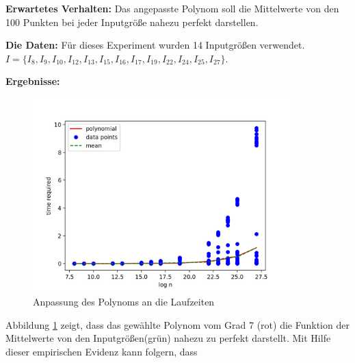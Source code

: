 \documentclass[12pt,oneside]{article}
\theoremstyle{remark}
\theoremstyle{definition}
\begin{document}
\textbf{\small{Erwartetes Verhalten:}}\newline
Das angepasste Polynom soll die Mittelwerte von den 100 Punkten bei jeder Inputgröße nahezu perfekt darstellen.

\textbf{\small{Die Daten:}}
Für dieses Experiment wurden 14 Inputgrößen verwendet.\newline 
$I = \{ I_{8},I_{9},I_{10},I_{12},I_{13},I_{15},I_{16},I_{17},I_{19},I_{22},I_{24},I_{25},I_{27} \}$.

\textbf{\small{Ergebnisse:}}
\begin{figure}[h]
\includegraphics[width=10cm]{plots/runtime_find_r.png}
\centering
\caption{Anpassung des Polynoms an die Laufzeiten}
\label{runtime-find_r}
\end{figure}

Abbildung \ref{runtime-find_r} zeigt, dass das gewählte Polynom vom Grad 7 (rot) die Funktion der Mittelwerte von den Inputgrößen(grün) nahezu zu perfekt darstellt. Mit Hilfe dieser empirischen Evidenz kann folgern, dass 
\end{document}
